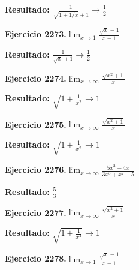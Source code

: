 \documentclass[10pt,a4paper]{article}
\begin{document}
\begin{solbox}
\textbf{Resultado:} \(\displaystyle \frac{1}{\sqrt{1+1/x}+1} \to \frac{1}{2}\)
\end{solbox}

\newpage
\begin{ejbox}
\textbf{Ejercicio 2273.}\quad $\lim_{x\to 1} \frac{\sqrt{x}-1}{x-1}$
\end{ejbox}

\begin{solbox}
\textbf{Resultado:} \(\displaystyle \frac{1}{\sqrt{x}+1} \to \frac{1}{2}\)
\end{solbox}

\begin{ejbox}
\textbf{Ejercicio 2274.}\quad $\lim_{x\to \infty} \frac{\sqrt{x^2+1}}{x}$
\end{ejbox}

\begin{solbox}
\textbf{Resultado:} \(\displaystyle \sqrt{1+\frac{1}{x^2}} \to 1\)
\end{solbox}

\begin{ejbox}
\textbf{Ejercicio 2275.}\quad $\lim_{x\to \infty} \frac{\sqrt{x^2+1}}{x}$
\end{ejbox}

\begin{solbox}
\textbf{Resultado:} \(\displaystyle \sqrt{1+\frac{1}{x^2}} \to 1\)
\end{solbox}

\newpage
\begin{ejbox}
\textbf{Ejercicio 2276.}\quad $\lim_{x\to \infty} \frac{5x^3 - 4x}{3x^3 + x^2 - 5}$
\end{ejbox}

\begin{solbox}
\textbf{Resultado:} \(\displaystyle \frac{5}{3}\)
\end{solbox}

\begin{ejbox}
\textbf{Ejercicio 2277.}\quad $\lim_{x\to \infty} \frac{\sqrt{x^2+1}}{x}$
\end{ejbox}

\begin{solbox}
\textbf{Resultado:} \(\displaystyle \sqrt{1+\frac{1}{x^2}} \to 1\)
\end{solbox}

\begin{ejbox}
\textbf{Ejercicio 2278.}\quad $\lim_{x\to 1} \frac{\sqrt{x}-1}{x-1}$
\end{ejbox}
\end{document}
